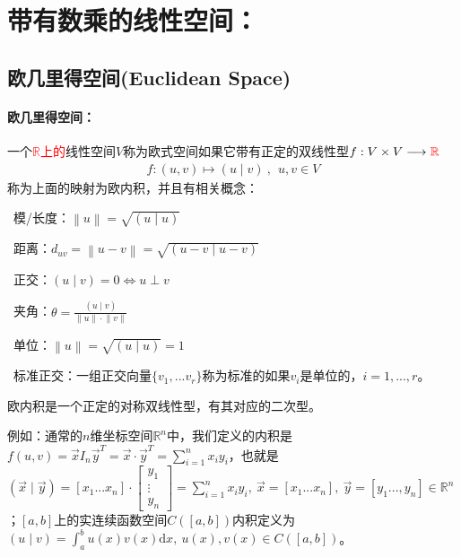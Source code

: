 \documentclass[zihao=5,UTF8]{report}
\theoremstyle{mystyle} %
\begin{document}
\chapter{带有数乘的线性空间：}\thispagestyle{fancy} 
\section{欧几里得空间(Euclidean Space)}
\subsubsection{欧几里得空间：}
一个\textcolor{red}{$\mathbb{R}$上的}线性空间$V$称为欧式空间如果它带有正定的双线性型$f: V\times V \longrightarrow \textcolor{red}{\mathbb{R}}$
\begin{gather*}
    f:(u,v) \longmapsto (u\mid v)\ ,\ \ u,v \in V    
\end{gather*}
称为上面的映射为欧内积，并且有相关概念：\par
{}\ 模/长度：$\left \| u \right \|  = \sqrt{(u\mid u)}$\par
{}\ 距离：$d_{uv} = \left \| u -v \right \| = \sqrt{(u-v\mid u-v)}$\par
{}\ 正交：$(u\mid v) = 0\Longleftrightarrow u \perp v $\par
{}\ 夹角：$\theta = \frac{(u\mid v)}{ \left \| u \right \|\cdot  \left \| v \right \|}$ \par
{}\ 单位：$ \left \| u \right \| = \sqrt{(u\mid u) } = 1$\par
{}\ 标准正交：一组正交向量$\{v_1,...v_r\}$称为标准的如果$v_i$是单位的，$i = 1,...,r$。

{\color{gray}\small 欧内积是一个正定的对称双线性型，有其对应的二次型。\par
例如：通常的$n$维坐标空间$\mathbb{R}^n$中，我们定义的内积是$f(u,v) = \vec{x}I_n\vec{y}^T = \vec{x}\cdot\vec{y}^T = \sum_{i=1}^{n}x_iy_i $，也就是$(\vec{x} \mid \vec{y}) = [x_1 ... x_n] \cdot 
\begin{bmatrix}
    y_1\\
    \vdots\\
    y_n
\end{bmatrix}
=\sum_{i = 1}^{n}x_iy_i,\ \vec{x} = [x_1 ... x_n],\ \vec{y} = [y_1...,y_n] \in \mathbb{R}^n$；$[a,b]$上的实连续函数空间$C([a,b])$内积定义为$(u \mid v) = \int_{a}^{b}u(x)v(x)\mathrm{d}x,\ u(x),v(x)\in C([a,b])$。}
\end{document}
